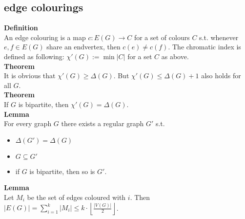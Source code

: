 \documentclass[a4paper, 12pt]{article}
\begin{document}
	\subsection{edge colourings}
	\textbf{Definition}\\
	An edge colouring is a map $c: E(G) \to C$ for a set of colours $C$ s.t. whenever $e,f \in E(G)$ share an endvertex, then $c(e)\neq c(f)$. The chromatic index is defined as following: $\chi'(G) := \min \left|C\right|$ for a set $C$ as above.\\
	\textbf{Theorem}\\
	It is obvious that $\chi'(G) \geq \Delta(G)$. But $\chi'(G) \leq \Delta(G)+1$ also holds for all $G$.\\
	\textbf{Theorem}\\
	If $G$ is bipartite, then $\chi'(G) = \Delta(G)$.\\
	\textbf{Lemma}\\
	For every graph $G$ there exists a regular graph $G'$ s.t. \begin{itemize}
		\item $\Delta(G') = \Delta(G)$
		\item $G\subseteq G'$
		\item if $G$ is bipartite, then so is $G'$.
	\end{itemize}
	\textbf{Lemma}\\
	Let $M_i$ be the set of edges coloured with $i$. Then $\left|E(G)\right| = \sum_{i=1}^{k} \left|M_i\right| \leq k\cdot \left\lfloor\frac{\left|V(G)\right|}{2}\right\rfloor$.
\end{document}

